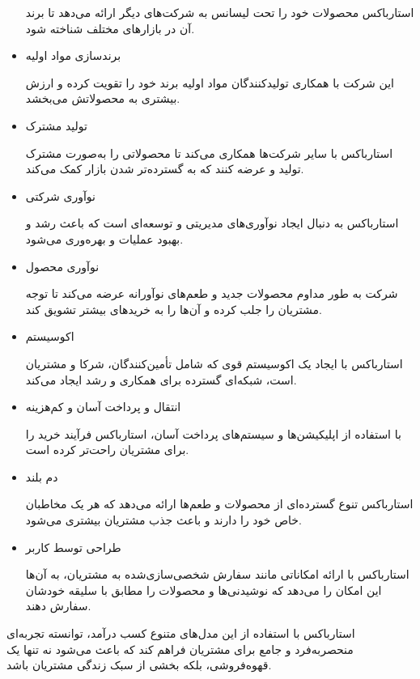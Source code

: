 \documentclass[dvipsnames, svgnames, x11names, 11pt, twocolumn]{article}
\begin{document}
\begin{itemize}
استارباکس محصولات خود را تحت لیسانس به شرکت‌های دیگر ارائه می‌دهد تا برند آن در بازارهای مختلف شناخته شود.

\item
برندسازی مواد اولیه

این شرکت با همکاری تولیدکنندگان مواد اولیه برند خود را تقویت کرده و ارزش بیشتری به محصولاتش می‌بخشد.

\item
تولید مشترک

استارباکس با سایر شرکت‌ها همکاری می‌کند تا محصولاتی را به‌صورت مشترک تولید و عرضه کنند که به گسترده‌تر شدن بازار کمک می‌کند.

\item
نوآوری شرکتی

استارباکس به دنبال ایجاد نوآوری‌های مدیریتی و توسعه‌ای است که باعث رشد و بهبود عملیات و بهره‌وری می‌شود.

\item
نوآوری محصول

شرکت به طور مداوم محصولات جدید و طعم‌های نوآورانه عرضه می‌کند تا توجه مشتریان را جلب کرده و آن‌ها را به خریدهای بیشتر تشویق کند.

\item
اکوسیستم

استارباکس با ایجاد یک اکوسیستم قوی که شامل تأمین‌کنندگان، شرکا و مشتریان است، شبکه‌ای گسترده برای همکاری و رشد ایجاد می‌کند.

\item
انتقال و پرداخت آسان و کم‌هزینه

با استفاده از اپلیکیشن‌ها و سیستم‌های پرداخت آسان، استارباکس فرآیند خرید را برای مشتریان راحت‌تر کرده است.

\item
دم بلند 

استارباکس تنوع گسترده‌ای از محصولات و طعم‌ها ارائه می‌دهد که هر یک مخاطبان خاص خود را دارند و باعث جذب مشتریان بیشتری می‌شود.

\item
طراحی توسط کاربر

استارباکس با ارائه امکاناتی مانند سفارش شخصی‌سازی‌شده به مشتریان، به آن‌ها این امکان را می‌دهد که نوشیدنی‌ها و محصولات را مطابق با سلیقه خودشان سفارش دهند.
\end{itemize}

استارباکس با استفاده از این مدل‌های متنوع کسب درآمد، توانسته تجربه‌ای منحصربه‌فرد و جامع برای مشتریان فراهم کند که باعث می‌شود نه تنها یک قهوه‌فروشی، بلکه بخشی از سبک زندگی مشتریان باشد.
\end{document}
